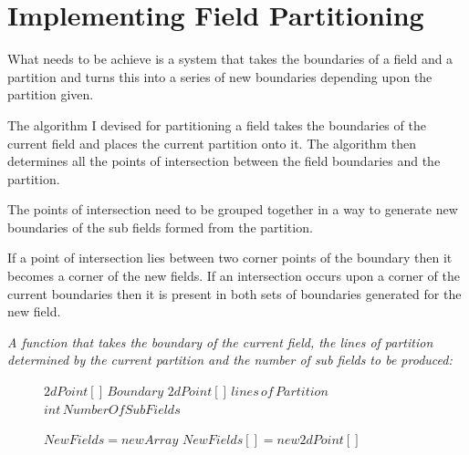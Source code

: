 \section{Implementing Field Partitioning}

What needs to be achieve is a system that takes the boundaries of a field and a partition and turns this into a series of new boundaries depending upon the partition given. 


The algorithm I devised for partitioning a field takes the boundaries of the current field and places the current partition onto it.   The algorithm then determines all the points of intersection between the field boundaries and the partition.  

The points of intersection need to be grouped together in a way to generate new boundaries of the sub fields formed from the partition.  

If a point of intersection lies between two corner points of the boundary then it becomes a corner of the new fields.  If an intersection occurs upon a corner of the current boundaries then it is present in both sets of boundaries generated for the new field. 


\emph{A function that takes the boundary of the current field, the lines of partition determined by the current partition and the number of sub fields to be produced:}

\begin{figure}[H]
\begin{algorithmic}

\STATE $2dPoint[] \, Boundary$
\STATE $2dPoint[] \, lines\, of\, Partition$
\STATE $int\, NumberOfSubFields $ \\




\STATE $New Fields = new Array$ 
	\STATE $New Fields[]=new 2dPoint[]$
	
\ENDFOR

\end{algorithmic}
\end{figure}


